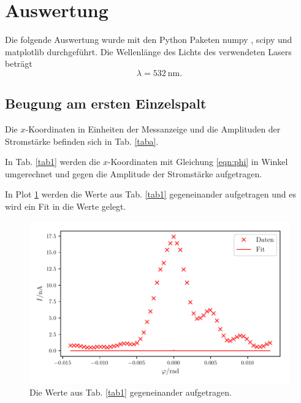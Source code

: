 \section{Auswertung}
\label{sec:Auswertung}

Die folgende Auswertung wurde mit den Python Paketen numpy \cite{numpy}, scipy \cite{scipy} und matplotlib \cite{matplotlib} durchgeführt. 
\newline
Die Wellenlänge des Lichts des verwendeten Lasers beträgt
\begin{equation*}
    \lambda = \SI{532}{\nano\meter}.
\end{equation*}
\subsection{Beugung am ersten Einzelspalt}
Die $x$-Koordinaten in Einheiten der Messanzeige und die Amplituden der Stromstärke befinden sich in Tab. \ref{taba}. 



\noindent In Tab. \ref{tab1} werden die $x$-Koordinaten mit Gleichung \eqref{eqn:phi} in Winkel umgerechnet und gegen die Amplitude der Stromstärke aufgetragen.



\noindent  In Plot \ref{fig:plot1} werden die Werte aus Tab. \ref{tab1} gegeneinander aufgetragen und es wird ein Fit in die Werte gelegt. 

\begin{figure}
    \centering
    \includegraphics[width=12cm, height=7cm]{build/plot1.pdf}
    \caption{Die Werte aus Tab. \ref{tab1} gegeneinander aufgetragen.}
    \label{fig:plot1}
\end{figure}

